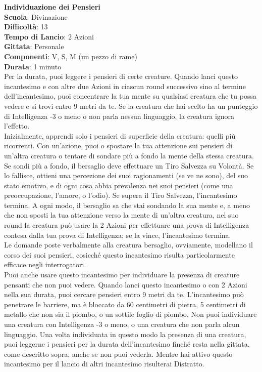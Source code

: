 \begin{multicols}{2}
\medskip\textbf{Individuazione dei Pensieri}\\
\textbf{Scuola}: Divinazione\\
\textbf{Difficoltà}: 13\\
\textbf{Tempo di Lancio}: 2 Azioni\\
\textbf{Gittata}: Personale\\
\textbf{Componenti}: V, S, M (un pezzo di rame)\\
\textbf{Durata}: 1 minuto\\
Per la durata, puoi leggere i pensieri di certe creature. Quando lanci questo incantesimo e con altre due Azioni in ciascun round successivo sino al termine dell'incantesimo, puoi concentrare la tua mente su qualsiasi creatura che tu possa vedere e si trovi entro 9 metri da te. Se la creatura che hai scelto ha un punteggio di Intelligenza -3 o meno o non parla nessun linguaggio, la creatura ignora l'effetto.\\
Inizialmente, apprendi solo i pensieri di superficie della creatura: quelli più ricorrenti. Con un'azione, puoi o spostare la tua attenzione sui pensieri di un'altra creatura o tentare di sondare più a fondo la mente della stessa creatura. Se sondi più a fondo, il bersaglio deve effettuare un Tiro Salvezza su Volontà. Se lo fallisce, ottieni una percezione dei suoi ragionamenti (se ve ne sono), del suo stato emotivo, e di ogni cosa abbia prevalenza nei suoi pensieri (come una preoccupazione, l'amore, o l'odio). Se supera il Tiro Salvezza, l'incantesimo termina. A ogni modo, il bersaglio sa che stai sondando la sua mente e, a meno che non sposti la tua attenzione verso la mente di un'altra creatura, nel suo round la creatura può usare la 2 Azioni per effettuare una prova di Intelligenza contesa dalla tua prova di Intelligenza; se la vince, l'incantesimo termina.\\
Le domande poste verbalmente alla creatura bersaglio, ovviamente, modellano il corso dei suoi pensieri, cosicché questo incantesimo risulta particolarmente efficace negli interrogatori.\\
Puoi anche usare questo incantesimo per individuare la presenza di creature pensanti che non puoi vedere. Quando lanci questo incantesimo o con 2 Azioni nella sua durata, puoi cercare pensieri entro 9 metri da te. L'incantesimo può penetrare le barriere, ma è bloccato da 60 centimetri di pietra, 5 centimetri di metallo che non sia il piombo, o un sottile foglio di piombo. Non puoi individuare una creatura con Intelligenza -3 o meno, o una creatura che non parla alcun linguaggio. Una volta individuata in questo modo la presenza di una creatura, puoi leggerne i pensieri per la durata dell'incantesimo finché resta nella gittata, come descritto sopra, anche se non puoi vederla.
Mentre hai attivo questo incantesimo per il lancio di altri incantesimo risulterai Distratto.


\end{multicols}
